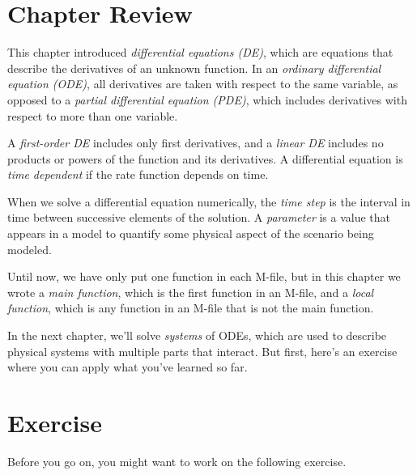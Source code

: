 \section{Chapter Review}

This chapter introduced \emph{differential equations (DE)}, which are equations that describe the
derivatives of an unknown function.
In an \emph{ordinary differential equation (ODE)}, all derivatives are taken with
respect to the same variable, as opposed to a \emph{partial differential equation (PDE)}, which includes derivatives with respect to more than one variable.

A \emph{first-order DE} includes only first derivatives, and a \emph{linear DE} includes no products or powers of the function and its derivatives.
A differential equation is \emph{time dependent} if the rate function depends on time.

When we solve a differential equation numerically, the \emph{time step} is the interval in time between successive elements of the solution.
A \emph{parameter} is a value that appears in a model to quantify some
physical aspect of the scenario being modeled.

Until now, we have only put one function in each M-file, but in this chapter we wrote a \emph{main function}, which is the first function in an M-file, and a \emph{local function}, which is any function in an M-file that is not the main function.

In the next chapter, we'll solve \emph{systems} of ODEs, which are used to describe physical systems with multiple parts that interact.
But first, here's an exercise where you can apply what you've learned so far.


\section{Exercise}

Before you go on, you might want to work on the following exercise.

